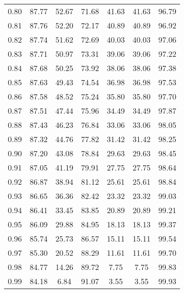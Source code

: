 \begin{tabular}{|c|c|c|c|c|c|c|}
      0.80 &     87.77 &     52.67 &      71.68 &   41.63 &      41.63 &         96.79 \\
      0.81 &     87.76 &     52.20 &      72.17 &   40.89 &      40.89 &         96.92 \\
      0.82 &     87.74 &     51.62 &      72.69 &   40.03 &      40.03 &         97.06 \\
      0.83 &     87.71 &     50.97 &      73.31 &   39.06 &      39.06 &         97.22 \\
      0.84 &     87.68 &     50.25 &      73.92 &   38.06 &      38.06 &         97.38 \\
      0.85 &     87.63 &     49.43 &      74.54 &   36.98 &      36.98 &         97.53 \\
      0.86 &     87.58 &     48.52 &      75.24 &   35.80 &      35.80 &         97.70 \\
      0.87 &     87.51 &     47.44 &      75.96 &   34.49 &      34.49 &         97.87 \\
      0.88 &     87.43 &     46.23 &      76.84 &   33.06 &      33.06 &         98.05 \\
      0.89 &     87.32 &     44.76 &      77.82 &   31.42 &      31.42 &         98.25 \\
      0.90 &     87.20 &     43.08 &      78.84 &   29.63 &      29.63 &         98.45 \\
      0.91 &     87.05 &     41.19 &      79.91 &   27.75 &      27.75 &         98.64 \\
      0.92 &     86.87 &     38.94 &      81.12 &   25.61 &      25.61 &         98.84 \\
      0.93 &     86.65 &     36.36 &      82.42 &   23.32 &      23.32 &         99.03 \\
      0.94 &     86.41 &     33.45 &      83.85 &   20.89 &      20.89 &         99.21 \\
      0.95 &     86.09 &     29.88 &      84.95 &   18.13 &      18.13 &         99.37 \\
      0.96 &     85.74 &     25.73 &      86.57 &   15.11 &      15.11 &         99.54 \\
      0.97 &     85.30 &     20.52 &      88.29 &   11.61 &      11.61 &         99.70 \\
      0.98 &     84.77 &     14.26 &      89.72 &    7.75 &       7.75 &         99.83 \\
      0.99 &     84.18 &      6.84 &      91.07 &    3.55 &       3.55 &         99.93 \\
\bottomrule
\end{tabular}
